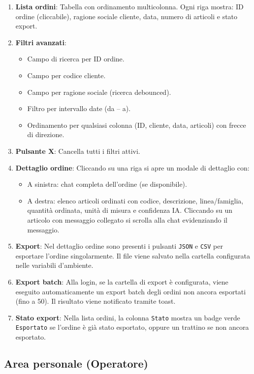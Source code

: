 \documentclass[a4paper, 11pt, oneside]{scrartcl}
\begin{document}
\begin{enumerate}
    \item \textbf{Lista ordini}: Tabella con ordinamento multicolonna. Ogni riga mostra: ID ordine (cliccabile), ragione sociale cliente, data, numero di articoli e stato export.
    \item \textbf{Filtri avanzati}:
    \begin{itemize}
        \item Campo di ricerca per ID ordine.
        \item Campo per codice cliente.
        \item Campo per ragione sociale (ricerca debounced).
        \item Filtro per intervallo date (da -- a).
        \item Ordinamento per qualsiasi colonna (ID, cliente, data, articoli) con frecce di direzione.
    \end{itemize}
    \item \textbf{Pulsante X}: Cancella tutti i filtri attivi.
    \item \textbf{Dettaglio ordine}: Cliccando su una riga si apre un modale di dettaglio con:
    \begin{itemize}
        \item A sinistra: chat completa dell'ordine (se disponibile).
        \item A destra: elenco articoli ordinati con codice, descrizione, linea/famiglia, quantit\`a ordinata, unit\`a di misura e confidenza IA. Cliccando su un articolo con messaggio collegato si scrolla alla chat evidenziando il messaggio.
    \end{itemize}
    \item \textbf{Export}: Nel dettaglio ordine sono presenti i pulsanti \texttt{JSON} e \texttt{CSV} per esportare l'ordine singolarmente. Il file viene salvato nella cartella configurata nelle variabili d'ambiente.
    \item \textbf{Export batch}: Alla login, se la cartella di export \`e configurata, viene eseguito automaticamente un export batch degli ordini non ancora esportati (fino a 50). Il risultato viene notificato tramite toast.
    \item \textbf{Stato export}: Nella lista ordini, la colonna \texttt{Stato} mostra un badge verde \texttt{Esportato} se l'ordine \`e gi\`a stato esportato, oppure un trattino se non ancora esportato.
\end{enumerate}

\subsection{Area personale (Operatore)}
\end{document}
